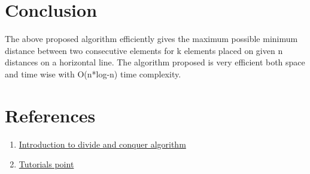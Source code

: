 \documentclass[conference]{IEEEtran}
\begin{document}
\section{\textbf {Conclusion}} \noindent The above proposed algorithm efficiently gives the maximum possible minimum distance  between two consecutive elements for k elements placed on given n distances on a  horizontal line. The algorithm proposed is very efficient both space and time wise with  O(n*log-n) time complexity.\\
\section{\textbf {References}} 
\begin{enumerate}

\item  \href{https://www.geeksforgeeks.org/divide-and-conquer-algorithm-introduction/}{Introduction to divide and conquer algorithm}\\
    
\item  \href{https://www.tutorialspoint.com/place-k-elements-such-that-minimum-distance-is-maximized-in-cplusplus}{
Tutorials point}
\\

\end{enumerate}
\end{document}
